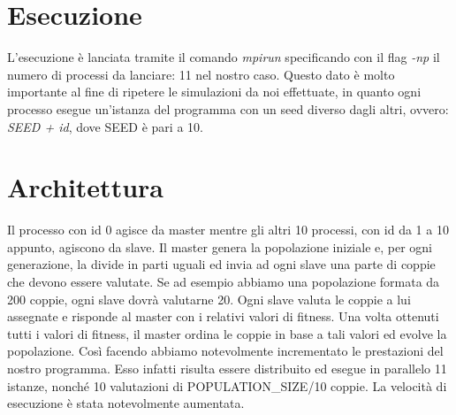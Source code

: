 \section{Esecuzione}
L'esecuzione è lanciata tramite il comando \textit{mpirun} specificando con il
flag \textit{-np} il numero di processi da lanciare: 11 nel nostro caso. Questo
dato è molto importante al fine di ripetere le simulazioni da noi effettuate, in
quanto ogni processo esegue un'istanza del programma con un seed diverso dagli
altri, ovvero: \textit{SEED + id}, dove SEED è pari a 10.



\section{Architettura}
Il processo con id 0 agisce da master mentre gli altri 10 processi, con id da 1
a 10 appunto, agiscono da slave. Il master genera la popolazione iniziale e,
per ogni generazione, la divide in parti uguali ed invia ad ogni slave una parte
di coppie che devono essere valutate. Se ad esempio abbiamo una popolazione
formata da 200 coppie, ogni slave dovrà valutarne 20. Ogni slave valuta le
coppie a lui assegnate e risponde al master con i relativi valori di fitness.
Una volta ottenuti tutti i valori di fitness, il master ordina le coppie in base
a tali valori ed evolve la popolazione.\newline
Così facendo abbiamo notevolmente incrementato le prestazioni del nostro
programma. Esso infatti risulta essere distribuito ed esegue in parallelo 11
istanze, nonché 10 valutazioni di POPULATION\_SIZE/10 coppie. La velocità di
esecuzione è stata notevolmente aumentata.
